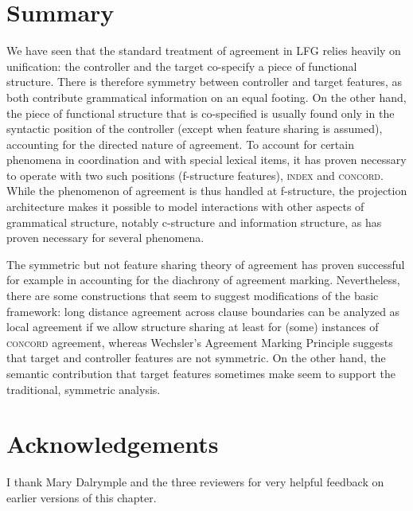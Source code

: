 \documentclass[output=paper,hidelinks]{langscibook}
\begin{document}
\section{Summary}
We have seen that the standard treatment of agreement in LFG relies heavily on
unification: the controller and the target co-specify a piece of
functional structure. There is therefore symmetry between controller
and target features, as both contribute grammatical information on an
equal footing. On the other hand, the piece of functional structure
that is co-specified is usually found only in the syntactic position of the
controller (except when feature sharing is assumed), accounting for the directed nature of agreement. To
account for certain phenomena in coordination and with special lexical
items, it has proven necessary to operate with two such positions
(f-structure features), \textsc{index} and
\textsc{concord}. While the phenomenon of agreement is thus handled at
f-structure, the projection architecture makes it possible to model
interactions with other aspects of grammatical structure, notably
c-structure and information structure, as has proven necessary for
several phenomena.

The symmetric but not feature sharing theory of agreement has proven
successful for example in accounting for the diachrony of agreement
marking. Nevertheless, there are some constructions that seem to
suggest modifications of the basic framework: long distance agreement
across clause boundaries can be analyzed as local agreement if we
allow structure sharing at least for (some) instances of
\textsc{concord} agreement, whereas Wechsler's Agreement Marking
Principle suggests that target and controller features are not
symmetric. On the other hand, the semantic contribution that target
features sometimes make seem to support the traditional, symmetric
analysis.


\section*{Acknowledgements}
I thank Mary Dalrymple and the three reviewers for very helpful feedback on earlier versions of this chapter.

\sloppy
\printbibliography[heading=subbibliography,notkeyword=this]
\end{document}
